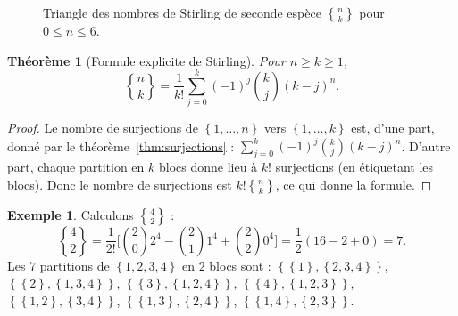 \documentclass[12pt,a4paper,openany]{book}
\theoremstyle{definition}
\newtheorem{exemple}[definition]{Exemple}
\theoremstyle{plain}
\newtheorem{theoreme}[definition]{Théorème}
\theoremstyle{remark}
\newcommand{\set}[1]{\left\{#1\right\}}
\begin{document}
\begin{figure}[ht]
\centering
{}
\caption{Triangle des nombres de Stirling de seconde espèce $\genfrac{\{}{\}}{0pt}{}{n}{k}$ pour $0 \leqslant n \leqslant 6$.}
\label{fig:triangle-stirling}
\end{figure}

\begin{theoreme}[Formule explicite de Stirling]
\label{thm:stirling-explicite}
Pour $n \geqslant k \geqslant 1$,
\[
  \genfrac{\{}{\}}{0pt}{}{n}{k}
    = \frac{1}{k!} \sum_{j=0}^{k} (-1)^{j} \binom{k}{j} (k-j)^n.
\]
\end{theoreme}

\begin{proof}
Le nombre de surjections de $\set{1,\dots,n}$ vers $\set{1,\dots,k}$ est,
d'une part, donné par le théorème~\ref{thm:surjections} :
$\sum_{j=0}^{k} (-1)^j \binom{k}{j}(k-j)^n$.
D'autre part, chaque partition en $k$ blocs donne lieu à $k!$ surjections
(en étiquetant les blocs). Donc le nombre de surjections est
$k! \genfrac{\{}{\}}{0pt}{}{n}{k}$, ce qui donne la formule.
\end{proof}

\begin{exemple}
\label{ex:stirling-calcul}
Calculons $\genfrac{\{}{\}}{0pt}{}{4}{2}$ :
\[
  \genfrac{\{}{\}}{0pt}{}{4}{2} = \frac{1}{2!}\bigl[\binom{2}{0}2^4 - \binom{2}{1}1^4 + \binom{2}{2}0^4\bigr]
  = \frac{1}{2}(16 - 2 + 0) = 7.
\]
Les $7$ partitions de $\set{1,2,3,4}$ en $2$ blocs sont :
$\set{\set{1},\set{2,3,4}}$, $\set{\set{2},\set{1,3,4}}$,
$\set{\set{3},\set{1,2,4}}$, $\set{\set{4},\set{1,2,3}}$,
$\set{\set{1,2},\set{3,4}}$, $\set{\set{1,3},\set{2,4}}$,
$\set{\set{1,4},\set{2,3}}$.
\end{exemple}
\end{document}
